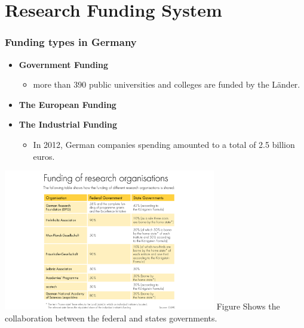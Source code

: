 \documentclass[9pt, compress]{beamer}
\begin{document}
	\section{Research Funding System }
	\begin{frame} 
		\frametitle{Funding types in Germany}
		\begin{itemize}
			\item\textbf{ Government Funding}
				\begin{itemize}
					\item more than 390 public universities and colleges are funded by the Länder.
				\end{itemize}
		\end{itemize}
	
			\begin{itemize}
				\item\textbf{ The European Funding}
			\end{itemize}
			\begin{itemize}
				\item\textbf{ The Industrial Funding}
							\begin{itemize}
								\item  In 2012, German companies  spending amounted to a total of 2.5 billion euros.
							\end{itemize}
			\end{itemize}

	\end{frame}
	\begin{frame} 
		\includegraphics[width=\textwidth,height=175pt]{img/FundingoResearch.png}
		\newline
		\centering
		Figure Shows the collaboration between the federal and states governments.
	\end{frame}
\end{document}
